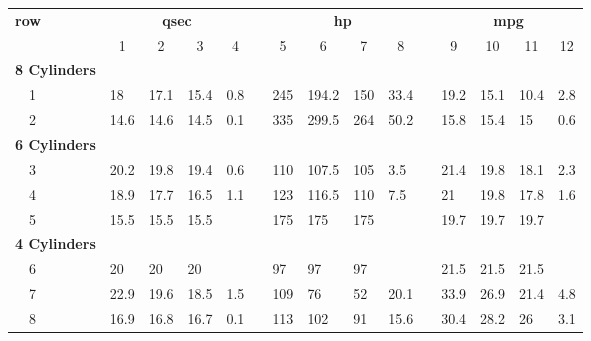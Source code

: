 \begin{table}[!tbp]
\begin{center}
\begin{tabular}{lllllcllllcllll}
\hline\hline
\multicolumn{1}{l}{\bfseries row}&\multicolumn{4}{c}{\bfseries qsec}&\multicolumn{1}{c}{\bfseries }&\multicolumn{4}{c}{\bfseries hp}&\multicolumn{1}{c}{\bfseries }&\multicolumn{4}{c}{\bfseries mpg}\tabularnewline
\cline{2-5} \cline{7-10} \cline{12-15}
\multicolumn{1}{l}{}&\multicolumn{1}{c}{1}&\multicolumn{1}{c}{2}&\multicolumn{1}{c}{3}&\multicolumn{1}{c}{4}&\multicolumn{1}{c}{}&\multicolumn{1}{c}{5}&\multicolumn{1}{c}{6}&\multicolumn{1}{c}{7}&\multicolumn{1}{c}{8}&\multicolumn{1}{c}{}&\multicolumn{1}{c}{9}&\multicolumn{1}{c}{10}&\multicolumn{1}{c}{11}&\multicolumn{1}{c}{12}\tabularnewline
\hline
{\bfseries 8 Cylinders}&&&&&&&&&&&&&&\tabularnewline
~~1&18&17.1&15.4&0.8&&245&194.2&150&33.4&&19.2&15.1&10.4&2.8\tabularnewline
~~2&14.6&14.6&14.5&0.1&&335&299.5&264&50.2&&15.8&15.4&15&0.6\tabularnewline
\hline
{\bfseries 6 Cylinders}&&&&&&&&&&&&&&\tabularnewline
~~3&20.2&19.8&19.4&0.6&&110&107.5&105&3.5&&21.4&19.8&18.1&2.3\tabularnewline
~~4&18.9&17.7&16.5&1.1&&123&116.5&110&7.5&&21&19.8&17.8&1.6\tabularnewline
~~5&15.5&15.5&15.5&&&175&175&175&&&19.7&19.7&19.7&\tabularnewline
\hline
{\bfseries 4 Cylinders}&&&&&&&&&&&&&&\tabularnewline
~~6&20&20&20&&&97&97&97&&&21.5&21.5&21.5&\tabularnewline
~~7&22.9&19.6&18.5&1.5&&109&76&52&20.1&&33.9&26.9&21.4&4.8\tabularnewline
~~8&16.9&16.8&16.7&0.1&&113&102&91&15.6&&30.4&28.2&26&3.1\tabularnewline
\hline
\end{tabular}\end{center}
\end{table}
